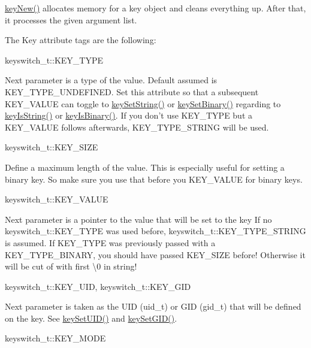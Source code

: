 \hyperlink{group__key_gaf6893c038b3ebee90c73a9ea8356bebf}{key\-New()} allocates memory for a key object and cleans everything up. After that, it processes the given argument list.

The Key attribute tags are the following\-:
\begin{DoxyItemize}
\item keyswitch\-\_\-t\-::\-K\-E\-Y\-\_\-\-T\-Y\-P\-E \par
 Next parameter is a type of the value. Default assumed is K\-E\-Y\-\_\-\-T\-Y\-P\-E\-\_\-\-U\-N\-D\-E\-F\-I\-N\-E\-D. Set this attribute so that a subsequent K\-E\-Y\-\_\-\-V\-A\-L\-U\-E can toggle to \hyperlink{group__keyvalue_ga622bde1eb0e0c4994728331326340ef2}{key\-Set\-String()} or \hyperlink{group__keyvalue_gaa50a5358fd328d373a45f395fa1b99e7}{key\-Set\-Binary()} regarding to \hyperlink{group__keytest_gaea7670778abd07fee0fe8ac12a149190}{key\-Is\-String()} or \hyperlink{group__keytest_ga9526b371087564e43e3dff8ad0dac949}{key\-Is\-Binary()}. If you don't use K\-E\-Y\-\_\-\-T\-Y\-P\-E but a K\-E\-Y\-\_\-\-V\-A\-L\-U\-E follows afterwards, K\-E\-Y\-\_\-\-T\-Y\-P\-E\-\_\-\-S\-T\-R\-I\-N\-G will be used.
\item keyswitch\-\_\-t\-::\-K\-E\-Y\-\_\-\-S\-I\-Z\-E \par
 Define a maximum length of the value. This is especially useful for setting a binary key. So make sure you use that before you K\-E\-Y\-\_\-\-V\-A\-L\-U\-E for binary keys.
\item keyswitch\-\_\-t\-::\-K\-E\-Y\-\_\-\-V\-A\-L\-U\-E \par
 Next parameter is a pointer to the value that will be set to the key If no keyswitch\-\_\-t\-::\-K\-E\-Y\-\_\-\-T\-Y\-P\-E was used before, keyswitch\-\_\-t\-::\-K\-E\-Y\-\_\-\-T\-Y\-P\-E\-\_\-\-S\-T\-R\-I\-N\-G is assumed. If K\-E\-Y\-\_\-\-T\-Y\-P\-E was previously passed with a K\-E\-Y\-\_\-\-T\-Y\-P\-E\-\_\-\-B\-I\-N\-A\-R\-Y, you should have passed K\-E\-Y\-\_\-\-S\-I\-Z\-E before! Otherwise it will be cut of with first \textbackslash{}0 in string!
\item keyswitch\-\_\-t\-::\-K\-E\-Y\-\_\-\-U\-I\-D, {\ttfamily keyswitch\-\_\-t\-::\-K\-E\-Y\-\_\-\-G\-I\-D} \par
 Next parameter is taken as the U\-I\-D (uid\-\_\-t) or G\-I\-D (gid\-\_\-t) that will be defined on the key. See \hyperlink{group__keymeta_gab5f284f5ecd261e0a290095f50ba1af7}{key\-Set\-U\-I\-D()} and \hyperlink{group__keymeta_ga9e3d0fb3f7ba906e067727b9155d22e3}{key\-Set\-G\-I\-D()}.
\item keyswitch\-\_\-t\-::\-K\-E\-Y\-\_\-\-M\-O\-D\-E \par

\end{DoxyItemize}
